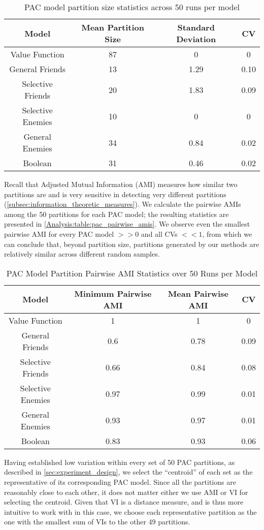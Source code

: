 \begin{table}[ht]
\centering
\begin{tabular}{|c|c|c|c|}
\hline
  Model & Mean Partition Size & Standard Deviation & CV \\ \hline
Value Function & 87 & 0 & 0 \\
General Friends & 13 & 1.29 & 0.10  \\
Selective Friends & 20 & 1.83 & 0.09  \\
Selective Enemies & 10 & 0 & 0 \\
General Enemies & 34 & 0.84 & 0.02 \\
Boolean & 31 & 0.46 & 0.02  \\
\hline
\end{tabular}
\caption{PAC model partition size statistics across 50 runs per model}
\label{Analysis:table:pac_num_coalitions}
\end{table}

Recall that Adjusted Mutual Information (AMI) measures how similar two
partitions are and is very sensitive in detecting very different partitions
(\autoref{subsec:information_theoretic_measures}).
We calculate the pairwise AMIs among the 50 partitions for each PAC model;
the resulting statistics are presented in \autoref{Analysis:table:pac_pairwise_amis}.
We observe even the smallest pairwise AMI for every PAC model $>> 0$ and all CVs
$<< 1$, from which we can conclude that, beyond partition size, partitions
generated by our methods are relatively similar across different random samples.

\begin{table}[ht]
\centering
\begin{tabular}{|c|c|c|c|}
\hline
  Model & Minimum Pairwise AMI & Mean Pairwise AMI & CV \\ \hline
Value Function & 1 & 1 & 0 \\
General Friends & 0.6 & 0.78 & 0.09  \\
Selective Friends & 0.66 & 0.84 & 0.08  \\
Selective Enemies & 0.97 & 0.99 & 0.01 \\
General Enemies & 0.93 & 0.97 & 0.01 \\
Boolean & 0.83 & 0.93 & 0.06  \\
\hline
\end{tabular}
\caption{PAC Model Partition Pairwise AMI Statistics over 50 Runs per Model}
\label{Analysis:table:pac_pairwise_amis}
\end{table}

Having established low variation within every set of 50
PAC partitions, as described in \autoref{sec:experiment_design}, we select
the ``centroid'' of each set as the representative of its corresponding PAC model.
Since all the partitions are reasonably close to each other, it does not
matter either we use AMI or VI for selecting the centroid.
Given that VI is a distance measure, and is thus more intuitive to work with in
this case, we choose each representative partition as the one with the smallest
sum of VIs to the other 49 partitions.

